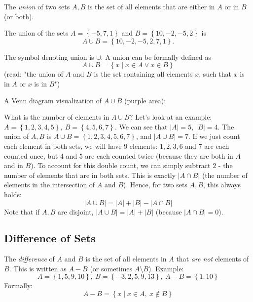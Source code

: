 The \emph{union} of two sets $A,B$ is the set of all elements that are either in $A$ or in $B$ (or both).
\begin{example}
  The union of the sets $A=\left\{	-5, 7, 1\right\}$ and $B=\left\{ 10, -2, -5, 2 \right\}$ is $$A\cup B=\left\{ 10, -2, -5, 2, 7, 1 \right\}.$$
\end{example}

The symbol denoting union is $\cup$. A union can be formally defined as
\begin{equation*}
  A\cup B = \left\{ x \mid x\in A \vee x\in B \right\}
\end{equation*}
(read: "the union of $A$ and $B$ is the set containing all elements $x$, such that $x$ is in $A$ or $x$ is in $B$")

A Venn diagram visualization of $A\cup B$ (purple area):
\begin{figure}[H]
  \centering
\end{figure}

What is the number of elements in $A\cup B$? Let's look at an example: $A=\left\{ 1,2,3,4,5 \right\},\ B=\left\{ 4,5,6,7 \right\}$. We can see that $|A|=5,\ |B|=4$. The union of $A,B$ is $A\cup B = \left\{ 1,2,3,4,5,6,7 \right\}$, and $\left|A\cup B\right|=7$. If we just count each element in both sets, we will have $9$ elements: $1,2,3,6$ and $7$ are each counted once, but $4$ and $5$ are each counted twice (because they are both in $A$ and in $B$). To account for this double count, we can simply subtract $2$ - the number of elements that are in both sets. This is exactly $\left|A\cap B\right|$ (the number of elements in the intersection of $A$ and $B$). Hence, for two sets $A,B$, this always holds:
\begin{equation*}
  \left|A\cup B\right| = |A| + |B| - \left|A\cap B\right|
\end{equation*}
Note that if $A,B$ are disjoint, $\left|A\cup B\right| = |A| + |B|$ (because $\left|A\cap B\right|=0$).

\subsection{Difference of Sets}
The \emph{difference} of $A$ and $B$ is the set of all elements in $A$ that \emph{are not} elements of $B$. This is written as $A-B$ (or sometimes $A\setminus B$). Example:
\begin{equation*}
  A = \left\{ 1,5,9,10 \right\},\ B=\left\{ -3,2,5,9,13 \right\},\ A-B=\left\{ 1,10 \right\}
\end{equation*}
Formally:
\begin{equation*}
  A-B = \left\{ x \mid x\in A,\ x\notin B\right\}
\end{equation*}

